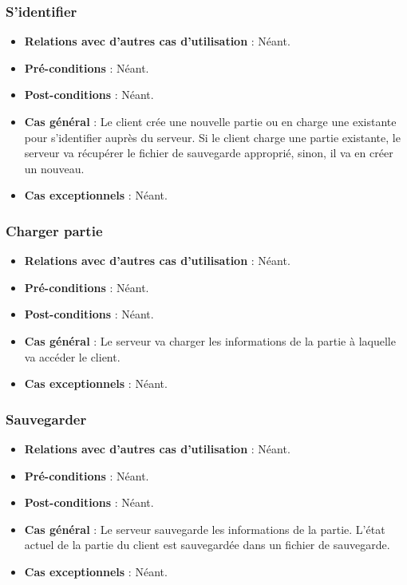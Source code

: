 \documentclass[a4paper,titlepage]{scrreprt}
\begin{document}
    \subsubsection{S'identifier}
      \begin{itemize}
        \item \textbf{Relations avec d'autres cas d'utilisation}  : Néant.
        \item \textbf{Pré-conditions} : Néant.
        \item \textbf{Post-conditions} : Néant.
        \item \textbf{Cas général} : Le client crée une nouvelle \gls{partie} ou en charge une existante pour s’identifier auprès du serveur. Si le client charge une partie existante, le serveur va récupérer le fichier de sauvegarde approprié, sinon, il va en créer un nouveau.
        \item \textbf{Cas exceptionnels} : Néant.
      \end{itemize}
    \subsubsection{Charger partie}
      \begin{itemize}
        \item \textbf{Relations avec d'autres cas d'utilisation}  : Néant.
        \item \textbf{Pré-conditions} : Néant.
        \item \textbf{Post-conditions} : Néant.
        \item \textbf{Cas général} : Le serveur va charger les informations de la partie à laquelle va accéder le client.
        \item \textbf{Cas exceptionnels} : Néant.
      \end{itemize}
    \subsubsection{Sauvegarder}
      \begin{itemize}
        \item \textbf{Relations avec d'autres cas d'utilisation}  : Néant.
        \item \textbf{Pré-conditions} : Néant.
        \item \textbf{Post-conditions} : Néant.
        \item \textbf{Cas général} : Le serveur sauvegarde les informations de la partie. L’état actuel de la partie du client est sauvegardée dans un fichier de sauvegarde.
        \item \textbf{Cas exceptionnels} : Néant.
      \end{itemize}
\end{document}
